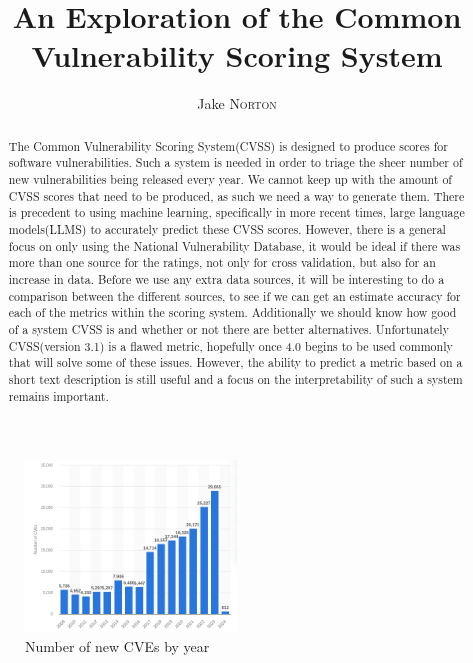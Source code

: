 \documentclass[12pt]{article}
\title{An Exploration of the Common Vulnerability Scoring System}
\author{Jake \textsc{Norton}}
\begin{document}
\maketitle

\begin{abstract}

	The Common Vulnerability Scoring System(CVSS\cite{CVSS}) is designed to produce scores for
	software vulnerabilities. Such a system is needed in order to triage the sheer number of new
	vulnerabilities being released every year. We cannot keep up with the amount of CVSS scores that
	need to be produced, as such we need a way to generate them. There is precedent to using machine
	learning, specifically in more recent times, large language models(LLMS) to accurately predict
	these CVSS scores.\cite{costa} However, there is a general focus on only using the National
	Vulnerability Database\cite{costa}\cite{nvd_example1}\cite{nvd_example2}, it would be ideal if
	there was more than one source for the ratings, not only for cross validation, but also for an
	increase in data. Before we use any extra data sources, it will be interesting to do a
	comparison between the different sources, to see if we can get an estimate accuracy for each of
	the metrics within the scoring system. Additionally we should know how good of a system CVSS is
	and whether or not there are better alternatives. Unfortunately CVSS(version 3.1\cite{CVSS_31}) is a flawed
	metric, hopefully once 4.0 begins to be used commonly that will solve some of these issues.
	However, the ability to predict a metric based on a short text description is still useful and a
	focus on the interpretability of such a system remains important.

\end{abstract}

\begin{figure}
	\centering
	\includegraphics[width=0.5\textwidth]{figures/cve_year.png}
	\caption{\label{fig:cve_year}Number of new CVEs by year}
\end{figure}
\end{document}
